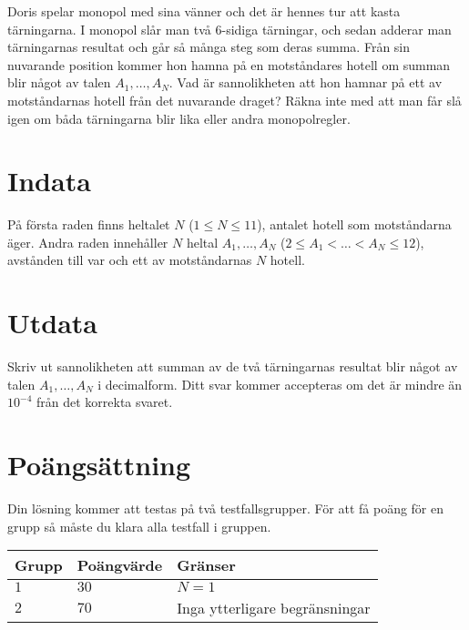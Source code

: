 \noindent
Doris spelar monopol med sina vänner och det är hennes tur att kasta tärningarna.
I monopol slår man två $6$-sidiga tärningar, och sedan adderar man tärningarnas resultat och går så många steg som deras summa.
Från sin nuvarande position kommer hon hamna på en motståndares hotell om summan blir något av talen $A_1, \dots, A_N$.
Vad är sannolikheten att hon hamnar på ett av motståndarnas hotell från det nuvarande draget?
Räkna inte med att man får slå igen om båda tärningarna blir lika eller andra monopolregler.

\section*{Indata}
\noindent
På första raden finns heltalet $N$ ($1 \leq N \leq 11$), antalet hotell som motståndarna äger.
Andra raden innehåller $N$ heltal $A_1, \dots, A_N$ ($2 \leq A_1 < \dots < A_N \leq 12$), avstånden till var och ett av motståndarnas $N$ hotell.

\section*{Utdata}
\noindent
Skriv ut sannolikheten att summan av de två tärningarnas resultat blir något av talen $A_1, \dots, A_N$ i decimalform.
Ditt svar kommer accepteras om det är mindre än $10^{-4}$ från det korrekta svaret.

\section*{Poängsättning}
Din lösning kommer att testas på två testfallsgrupper.
\noindent
För att få poäng för en grupp så måste du klara alla testfall i gruppen.

\noindent
\begin{tabular}{| l | l | l |}
\hline
  Grupp & Poängvärde & Gränser \\ \hline
  $1$    & $30$       &  $N = 1$ \\ \hline
  $2$    & $70$       &  Inga ytterligare begränsningar \\ \hline
\end{tabular}
